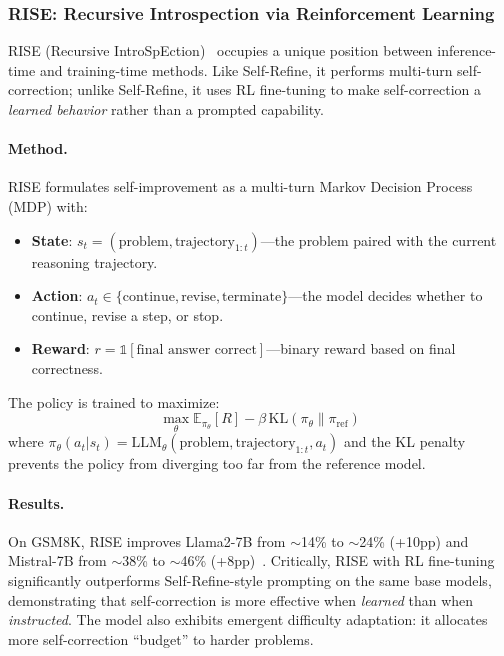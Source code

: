 \subsubsection{RISE: Recursive Introspection via Reinforcement Learning}
\label{sec:rise}

RISE (Recursive IntroSpEction)~\citep{qu2024rise} occupies a unique position between inference-time and training-time methods. Like Self-Refine, it performs multi-turn self-correction; unlike Self-Refine, it uses RL fine-tuning to make self-correction a \emph{learned behavior} rather than a prompted capability.

\paragraph{Method.}
RISE formulates self-improvement as a multi-turn Markov Decision Process (MDP) with:
\begin{itemize}
    \item \textbf{State}: $s_t = (\text{problem}, \text{trajectory}_{1:t})$---the problem paired with the current reasoning trajectory.
    \item \textbf{Action}: $a_t \in \{\text{continue}, \text{revise}, \text{terminate}\}$---the model decides whether to continue, revise a step, or stop.
    \item \textbf{Reward}: $r = \mathbb{1}[\text{final answer correct}]$---binary reward based on final correctness.
\end{itemize}

The policy is trained to maximize:
\begin{equation}
    \max_\theta \mathbb{E}_{\pi_\theta}[R] - \beta \, \text{KL}(\pi_\theta \| \pi_{\text{ref}})
    \label{eq:rise-objective}
\end{equation}
where $\pi_\theta(a_t | s_t) = \text{LLM}_\theta(\text{problem}, \text{trajectory}_{1:t}, a_t)$ and the KL penalty prevents the policy from diverging too far from the reference model.

\paragraph{Results.}
On GSM8K, RISE improves Llama2-7B from $\sim$14\% to $\sim$24\% (+10pp) and Mistral-7B from $\sim$38\% to $\sim$46\% (+8pp)~\citep{qu2024rise}. Critically, RISE with RL fine-tuning significantly outperforms Self-Refine-style prompting on the same base models, demonstrating that self-correction is more effective when \emph{learned} than when \emph{instructed}. The model also exhibits emergent difficulty adaptation: it allocates more self-correction ``budget'' to harder problems.

